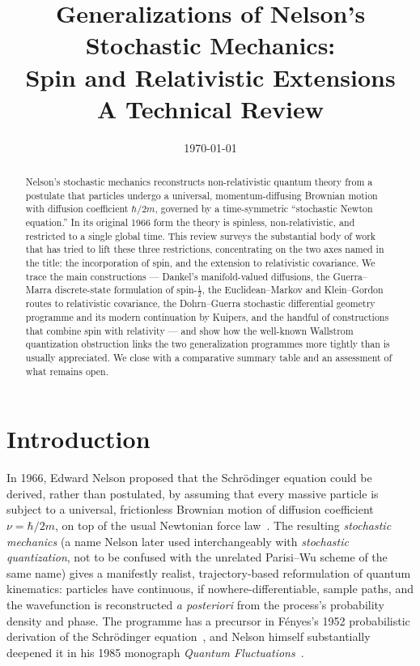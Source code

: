 \documentclass[11pt]{article}
\title{\bfseries Generalizations of Nelson's Stochastic Mechanics:\\
Spin and Relativistic Extensions\\[4pt]
\large A Technical Review}
\author{}
\date{\today}
\begin{document}
\maketitle

\begin{abstract}
\noindent Nelson's stochastic mechanics reconstructs non-relativistic
quantum theory from a postulate that particles undergo a universal,
momentum-diffusing Brownian motion with diffusion coefficient $\hbar/2m$, 
governed by a time-symmetric ``stochastic Newton equation.'' In its
original 1966 form the theory is spinless, non-relativistic, and restricted to a single global time. This review surveys the substantial
body of work that has tried to lift these three restrictions,
concentrating on the two axes named in the title: the incorporation of
spin, and the extension to relativistic covariance. We trace the main
constructions --- Dankel's manifold-valued diffusions, the Guerra--
    Marra discrete-state formulation of spin-$\tfrac{1}{2}$, the 
Euclidean--Markov and Klein--Gordon routes to relativistic covariance,
the Dohrn--Guerra stochastic differential geometry programme and its modern continuation by Kuipers, and the handful of constructions that
combine spin with relativity --- and show how the well-known Wallstrom
quantization obstruction links the two generalization programmes more
tightly than is usually appreciated. We close with a comparative
summary table and an assessment of what remains open.
\end{abstract}

\tableofcontents

\section{Introduction}

In 1966, Edward Nelson proposed that the Schr\"odinger equation could be
derived, rather than postulated, by assuming that every massive particle is
subject to a universal, frictionless Brownian motion of diffusion
coefficient $\nu = \hbar/2m$, on top of the usual Newtonian force
law~\cite{nelson66,nelson67}. The resulting \emph{stochastic mechanics} (a
name Nelson later used interchangeably with \emph{stochastic quantization},
not to be confused with the unrelated Parisi--Wu scheme of the same name)
gives a manifestly realist, trajectory-based reformulation of quantum
kinematics: particles have continuous, if nowhere-differentiable, sample 
paths, and the wavefunction is reconstructed \emph{a posteriori} from the
process's probability density and phase. The programme has a precursor in
Fényes's 1952 probabilistic derivation of the Schr\"odinger
equation~\cite{fenyes52}, and Nelson himself substantially deepened it in
his 1985 monograph \emph{Quantum Fluctuations}~\cite{nelson85}.
\end{document}
